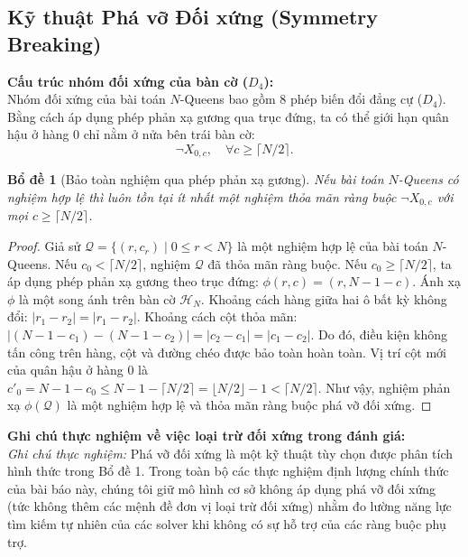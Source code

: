 \documentclass[a4paper,fleqn]{cas-sc}
\newtheorem{lemma}{Bổ đề}
\begin{document}
\subsection{Kỹ thuật Phá vỡ Đối xứng (Symmetry Breaking)}

\noindent\textbf{Cấu trúc nhóm đối xứng của bàn cờ ($D_4$):}\\
Nhóm đối xứng của bài toán $N$-Queens bao gồm 8 phép biến đổi đẳng cự ($D_4$). Bằng cách áp dụng phép phản xạ gương qua trục đứng, ta có thể giới hạn quân hậu ở hàng 0 chỉ nằm ở nửa bên trái bàn cờ:
\begin{equation}
    \neg X_{0, c}, \quad \forall c \ge \lceil N / 2 \rceil.
\end{equation}

\begin{lemma}[Bảo toàn nghiệm qua phép phản xạ gương]
Nếu bài toán $N$-Queens có nghiệm hợp lệ thì luôn tồn tại ít nhất một nghiệm thỏa mãn ràng buộc $\neg X_{0, c}$ với mọi $c \ge \lceil N/2 \rceil$.
\end{lemma}
\begin{proof}
Giả sử $\mathcal{Q} = \{(r, c_r) \mid 0 \le r < N\}$ là một nghiệm hợp lệ của bài toán $N$-Queens. Nếu $c_0 < \lceil N/2 \rceil$, nghiệm $\mathcal{Q}$ đã thỏa mãn ràng buộc. Nếu $c_0 \ge \lceil N/2 \rceil$, ta áp dụng phép phản xạ gương theo trục đứng: $\phi(r, c) = (r, N - 1 - c)$. Ánh xạ $\phi$ là một song ánh trên bàn cờ $\mathcal{H}_N$. Khoảng cách hàng giữa hai ô bất kỳ không đổi: $|r_1 - r_2| = |r_1 - r_2|$. Khoảng cách cột thỏa mãn: $|(N - 1 - c_1) - (N - 1 - c_2)| = |c_2 - c_1| = |c_1 - c_2|$. Do đó, điều kiện không tấn công trên hàng, cột và đường chéo được bảo toàn hoàn toàn. Vị trí cột mới của quân hậu ở hàng 0 là $c'_0 = N - 1 - c_0 \le N - 1 - \lceil N/2 \rceil = \lfloor N/2 \rfloor - 1 < \lceil N/2 \rceil$. Như vậy, nghiệm phản xạ $\phi(\mathcal{Q})$ là một nghiệm hợp lệ và thỏa mãn ràng buộc phá vỡ đối xứng.
\end{proof}

\noindent\textbf{Ghi chú thực nghiệm về việc loại trừ đối xứng trong đánh giá:}\\
\textit{Ghi chú thực nghiệm:} Phá vỡ đối xứng là một kỹ thuật tùy chọn được phân tích hình thức trong Bổ đề 1. Trong toàn bộ các thực nghiệm định lượng chính thức của bài báo này, chúng tôi giữ mô hình cơ sở không áp dụng phá vỡ đối xứng (tức không thêm các mệnh đề đơn vị loại trừ đối xứng) nhằm đo lường năng lực tìm kiếm tự nhiên của các solver khi không có sự hỗ trợ của các ràng buộc phụ trợ.
\end{document}
